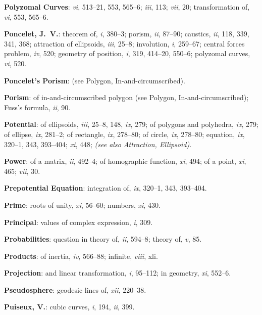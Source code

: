 \documentclass[11pt,a4paper]{article}
\newcommand{\IndexEntry}[1]{\textbf{#1}}
\newcommand{\SeeAlso}[1]{\textit{(see also #1)}}
\newcommand{\V}[1]{\textit{#1}} %
\begin{document}
\setcounter{page}{118}

\IndexEntry{Polyzomal Curves}: \V{vi}, 513--21, 553, 565--6; \V{iii}, 113; \V{vii}, 20; transformation of, \V{vi}, 553, 565--6.

\IndexEntry{Poncelet, J.\ V.}: theorem of, \V{i}, 380--3; porism, \V{ii}, 87--90; caustics, \V{ii}, 118, 339, 341, 368; attraction of ellipsoids, \V{iii}, 25--8; involution, \V{i}, 259--67; central forces problem, \V{iv}, 520; geometry of position, \V{i}, 319, 414--20, 550--6; polyzomal curves, \V{vi}, 520.

\IndexEntry{Poncelet's Porism}: (see Polygon, In-and-circumscribed).

\IndexEntry{Porism}: of in-and-circumscribed polygon (see Polygon, In-and-circumscribed); Fuss's formula, \V{ii}, 90.

\IndexEntry{Potential}: of ellipsoids, \V{iii}, 25--8, 148, \V{ix}, 279; of polygons and polyhedra, \V{ix}, 279; of ellipse, \V{ix}, 281--2; of rectangle, \V{ix}, 278--80; of circle, \V{ix}, 278--80; equation, \V{ix}, 320--1, 343, 393--404; \V{xi}, 448; \SeeAlso{Attraction, Ellipsoid}.

\IndexEntry{Power}: of a matrix, \V{ii}, 492--4; of homographic function, \V{xi}, 494; of a point, \V{xi}, 465; \V{vii}, 30.

\IndexEntry{Prepotential Equation}: integration of, \V{ix}, 320--1, 343, 393--404.

\IndexEntry{Prime}: roots of unity, \V{xi}, 56--60; numbers, \V{xi}, 430.

\IndexEntry{Principal}: values of complex expression, \V{i}, 309.

\IndexEntry{Probabilities}: question in theory of, \V{ii}, 594--8; theory of, \V{v}, 85.

\IndexEntry{Products}: of inertia, \V{iv}, 566--88; infinite, \V{viii}, xli.

\IndexEntry{Projection}: and linear transformation, \V{i}, 95--112; in geometry, \V{xi}, 552--6.

\IndexEntry{Pseudosphere}: geodesic lines of, \V{xii}, 220--38.

\IndexEntry{Puiseux, V.}: cubic curves, \V{i}, 194, \V{ii}, 399.

\newpage

\setcounter{page}{119}
\end{document}
